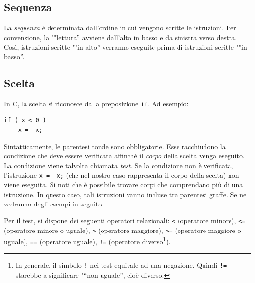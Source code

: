 		\subsection{Sequenza}
La \emph{sequenza} è determinata dall'ordine in cui vengono scritte le istruzioni. Per convenzione, la ""lettura'' avviene dall'alto in basso e da sinistra verso destra. Così, istruzioni scritte ""in alto'' verranno eseguite prima di istruzioni scritte ""in basso''.

		\subsection{Scelta}
In C, la scelta si riconosce dalla preposizione \lstinline!if!. Ad esempio:

\begin{lstlisting}
if ( x < 0 )
	x = -x;
\end{lstlisting}
Sintatticamente, le parentesi tonde sono obbligatorie. Esse racchiudono la condizione che deve essere verificata affinché il \emph{corpo} della scelta venga eseguito. La condizione viene talvolta chiamata \emph{test}. Se la condizione non è verificata, l'istruzione \lstinline!x = -x;! (che nel nostro caso rappresenta il corpo della scelta) non viene eseguita. Si noti che è possibile trovare corpi che comprendano più di una istruzione. In questo caso, tali istruzioni vanno incluse tra parentesi graffe. Se ne vedranno degli esempi in seguito.

Per  il test, si dispone dei seguenti operatori relazionali: \lstinline!<! (operatore minore), \lstinline!<=! (operatore minore o uguale), \lstinline!>! (operatore maggiore), \lstinline!>=! (operatore maggiore o uguale), \lstinline!==! (operatore uguale), \lstinline?!=? (operatore diverso\footnote{In generale, il simbolo \lstinline?!? nei test equivale ad una negazione. Quindi \lstinline?!=? starebbe a significare "“non uguale'', cioè diverso.}).


